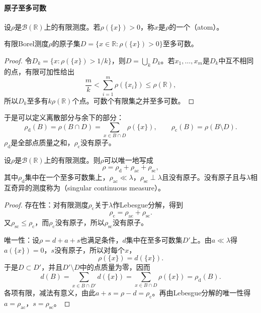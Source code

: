 \paragraph{原子至多可数}
设$\rho$是$\mathcal B(\mathbb R)$上的有限测度。若$\rho(\{x\})>0$，称$x$是$\rho$的一个（atom）。

\begin{lemma}[原子至多可数]
\label{lem:dens-atoms-countable}
有限Borel测度$\rho$的原子集$D=\{x\in\mathbb R:\rho(\{x\})>0\}$至多可数。
\end{lemma}

\begin{proof}
令$D_k=\{x:\rho(\{x\})>1/k\}$，则$D=\bigcup_kD_k$。若$x_1,\ldots,x_m$是$D_k$中互不相同的点，有限可加性给出
\[
\frac mk<\sum_{i=1}^m\rho(\{x_i\})\leq\rho(\mathbb R),
\]
所以$D_k$至多有$k\rho(\mathbb R)$个点。可数个有限集之并至多可数。
\end{proof}

于是可以定义离散部分与余下的部分：
\[
\rho_{\mathrm d}(B)=\rho(B\cap D)=\sum_{x\in B\cap D}\rho(\{x\}),\qquad\rho_{\mathrm c}(B)=\rho(B\setminus D).
\]
$\rho_{\mathrm d}$是全部点质量之和，$\rho_{\mathrm c}$没有原子。

\begin{theorem}[实轴上有限测度的分解]
\label{thm:dens-three-part}
设$\rho$是$\mathcal B(\mathbb R)$上的有限测度。则$\rho$可以唯一地写成
\begin{equation}
\rho=\rho_{\mathrm d}+\rho_{\mathrm{ac}}+\rho_{\mathrm{sc}},
\label{eq:dens-three-part}
\end{equation}
其中$\rho_{\mathrm d}$集中在一个至多可数集上，$\rho_{\mathrm{ac}}\ll\lambda$，$\rho_{\mathrm{sc}}\perp\lambda$且没有原子。没有原子且与$\lambda$相互奇异的测度称为（singular continuous measure）。
\end{theorem}

\begin{proof}
存在性：对有限测度$\rho_{\mathrm c}$关于$\lambda$作Lebesgue分解，得到
\[
\rho_{\mathrm c}=\rho_{\mathrm{ac}}+\rho_{\mathrm{sc}} .
\]
又$\rho_{\mathrm{sc}}\leq\rho_{\mathrm c}$，而$\rho_{\mathrm c}$没有原子，所以$\rho_{\mathrm{sc}}$没有原子。

唯一性：设$\rho=d+a+s$也满足条件，$d$集中在至多可数集$D'$上。由$a\ll\lambda$得$a(\{x\})=0$，$s$没有原子，所以对每个$x$，
\[
\rho(\{x\})=d(\{x\}).
\]
于是$D\subset D'$，并且$D'\setminus D$中的点质量为零，因而
\[
d(B)=\sum_{x\in B\cap D'}d(\{x\})=\sum_{x\in B\cap D}\rho(\{x\})=\rho_{\mathrm d}(B).
\]
各项有限，减法有意义，由此$a+s=\rho-d=\rho_{\mathrm c}$。再由Lebesgue分解的唯一性得$a=\rho_{\mathrm{ac}}$，$s=\rho_{\mathrm{sc}}$。
\end{proof}

